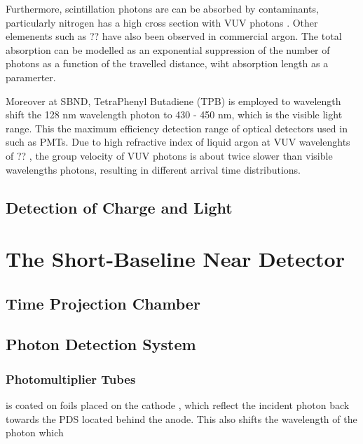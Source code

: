 Furthermore, scintillation photons are can be absorbed by contaminants, particularly nitrogen has a high cross section with VUV photons \cite{}.
Other elemenents such as ?? have also been observed in commercial argon.
The total absorption can be modelled as an exponential suppression of the number of photons as a function of the travelled distance, wiht absorption length as a paramerter. 

Moreover at SBND, TetraPhenyl Butadiene (TPB) is employed to wavelength shift the 128 nm wavelength photon to 430 - 450 nm, which is the visible light range.
This the maximum efficiency detection range of optical detectors used in such as PMTs.
Due to high refractive index of liquid argon at VUV wavelenghts of ?? \cite{}, the group velocity of VUV photons is about twice slower than visible wavelengths photons, resulting in different arrival time distributions.




\subsection{Detection of Charge and Light}

\label{sec3:detection}



\section{The Short-Baseline Near Detector}



\subsection{Time Projection Chamber}

\subsection{Photon Detection System}

\subsubsection{Photomultiplier Tubes}
is coated on foils placed on the cathode
, which reflect the incident photon back towards the PDS located behind the anode. 
This also shifts the wavelength of the photon which 

